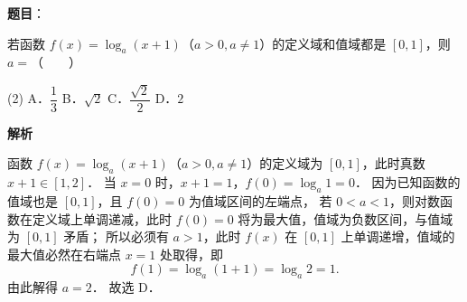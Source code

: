 \begin{answer}

\textbf{题目}：

若函数 $f(x) = \log_a (x + 1)$（$a > 0, a \neq 1$）的定义域和值域都是 $[0, 1]$，则 $a =$\mbox{（　　）}

\begin{gkopts}(2)
\task A．$\dfrac{1}{3}$
\task B．$\sqrt{2}$
\task C．$\dfrac{\sqrt{2}}{2}$
\task D．$2$
\end{gkopts}

\textbf{解析}

函数 $f(x) = \log_a (x + 1)$（$a > 0, a \neq 1$）的定义域为 $[0, 1]$，此时真数 $x + 1 \in [1, 2]$．
当 $x = 0$ 时，$x + 1 = 1$，$f(0) = \log_a 1 = 0$．
因为已知函数的值域也是 $[0, 1]$，且 $f(0) = 0$ 为值域区间的左端点，
若 $0 < a < 1$，则对数函数在定义域上单调递减，此时 $f(0) = 0$ 将为最大值，值域为负数区间，与值域为 $[0, 1]$ 矛盾；
所以必须有 $a > 1$，此时 $f(x)$ 在 $[0, 1]$ 上单调递增，值域的最大值必然在右端点 $x = 1$ 处取得，即
\nopagebreak[4]
\[
f(1) = \log_a (1 + 1) = \log_a 2 = 1.
\]
由此解得 $a = 2$．
故选 D．


\end{answer}
